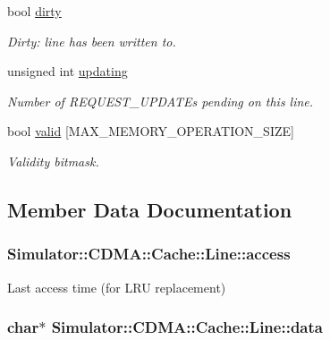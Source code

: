 \begin{DoxyCompactItemize}
bool \hyperlink{struct_simulator_1_1_c_d_m_a_1_1_cache_1_1_line_aab45844e3f59e09ead680535185949f7}{dirty}
\begin{DoxyCompactList}\small\item\em Dirty\+: line has been written to. \end{DoxyCompactList}\item 
unsigned int \hyperlink{struct_simulator_1_1_c_d_m_a_1_1_cache_1_1_line_a69897df58e274ca6b725235039354f09}{updating}
\begin{DoxyCompactList}\small\item\em Number of R\+E\+Q\+U\+E\+S\+T\+\_\+\+U\+P\+D\+A\+T\+Es pending on this line. \end{DoxyCompactList}\item 
bool \hyperlink{struct_simulator_1_1_c_d_m_a_1_1_cache_1_1_line_a2d54eb0d7314994bf848a36f462b0bf4}{valid} \mbox{[}M\+A\+X\+\_\+\+M\+E\+M\+O\+R\+Y\+\_\+\+O\+P\+E\+R\+A\+T\+I\+O\+N\+\_\+\+S\+I\+Z\+E\mbox{]}
\begin{DoxyCompactList}\small\item\em Validity bitmask. \end{DoxyCompactList}\end{DoxyCompactItemize}


\subsection{Member Data Documentation}
\hypertarget{struct_simulator_1_1_c_d_m_a_1_1_cache_1_1_line_a8ff21723afff19b77f205320c3beb774}{
\subsubsection[{access}]{ Simulator\+::\+C\+D\+M\+A\+::\+Cache\+::\+Line\+::access}}\label{struct_simulator_1_1_c_d_m_a_1_1_cache_1_1_line_a8ff21723afff19b77f205320c3beb774}


Last access time (for L\+R\+U replacement) 

\hypertarget{struct_simulator_1_1_c_d_m_a_1_1_cache_1_1_line_ab7fed1d8d57d1346a8aec0f4da72e8f7}{
\subsubsection[{data}]{\setlength{\rightskip}{0pt plus 5cm}char$\ast$ Simulator\+::\+C\+D\+M\+A\+::\+Cache\+::\+Line\+::data}}\label{struct_simulator_1_1_c_d_m_a_1_1_cache_1_1_line_ab7fed1d8d57d1346a8aec0f4da72e8f7}


